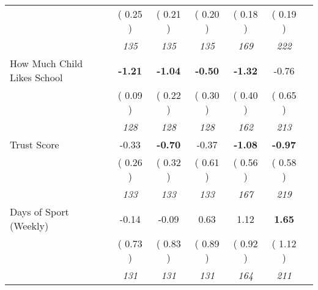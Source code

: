 \begin{tabular}{l c c c c c c}
& (     0.25 ) & (     0.21 ) & (     0.20 ) & (     0.18 ) & (     0.19 ) \\
& \textit{ 135 } & \textit{ 135 } & \textit{ 135 } & \textit{ 169 } & \textit{ 222 } \\
How Much Child Likes School & \textbf{     -1.21 } & \textbf{     -1.04 } & \textbf{     -0.50 } & \textbf{     -1.32 } &     -0.76 \\
& (     0.09 ) & (     0.22 ) & (     0.30 ) & (     0.40 ) & (     0.65 ) \\
& \textit{ 128 } & \textit{ 128 } & \textit{ 128 } & \textit{ 162 } & \textit{ 213 } \\
Trust Score &     -0.33 & \textbf{     -0.70 } &     -0.37 & \textbf{     -1.08 } & \textbf{     -0.97 } \\
& (     0.26 ) & (     0.32 ) & (     0.61 ) & (     0.56 ) & (     0.58 ) \\
& \textit{ 133 } & \textit{ 133 } & \textit{ 133 } & \textit{ 167 } & \textit{ 219 } \\
Days of Sport (Weekly) &     -0.14 &     -0.09 &      0.63 &      1.12 & \textbf{      1.65 } \\
& (     0.73 ) & (     0.83 ) & (     0.89 ) & (     0.92 ) & (     1.12 ) \\
& \textit{ 131 } & \textit{ 131 } & \textit{ 131 } & \textit{ 164 } & \textit{ 211 } \\
\bottomrule
\end{tabular}
